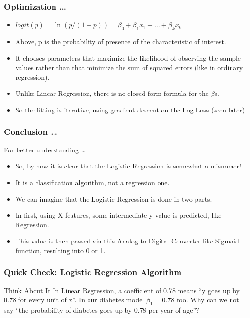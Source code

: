 \begin{frame}[fragile]\frametitle{Optimization \ldots}
 \begin{itemize}
\item $logit(p) = \ln(p/(1-p)) = \beta_0 + \beta_1 x_1 +  \ldots + \beta_k x_k$

\item Above, p is the probability of presence of the characteristic of interest.
\item It chooses parameters that maximize  the  likelihood  of  observing  the  sample  values  rather  than  that  minimize  the  sum  of squared errors (like in ordinary regression).
\item Unlike Linear Regression, there is no closed form formula for the $\beta$s.
\item So the fitting is iterative, using gradient descent on the Log Loss (seen later).
\end{itemize}

\end{frame}

\begin{frame}[fragile]\frametitle{Conclusion \ldots}
For better understanding \ldots
 \begin{itemize}
 \item So, by now it is clear that the Logistic Regression is somewhat a misnomer!
\item It is a classification algorithm, not a regression one.
\item We can imagine that the Logistic Regression is done in two parts.
\item In first, using X features, some intermediate y value is predicted, like Regression.
\item This value is then passed via this Analog to Digital Converter like Sigmoid function, resulting into 0 or 1.
\end{itemize}
\end{frame}

\begin{frame}[fragile]\frametitle{Quick Check: Logistic Regression Algorithm}
\begin{block}{Think About It}
In Linear Regression, a coefficient of 0.78 means ``y goes up by 0.78 for every unit of x''. In our diabetes model $\beta_1 = 0.78$ too. Why can we not say ``the probability of diabetes goes up by 0.78 per year of age''?
\end{block}
\end{frame}

